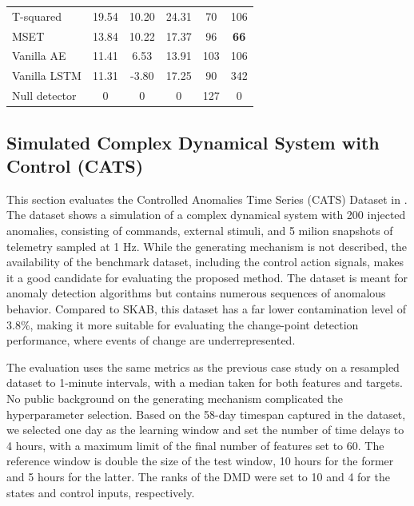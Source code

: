 \begin{table}[H]
\begin{tabular}{l *3{S[table-format=3.2]} *2{S[table-format=3.0]}}
        T-squared                    & 19.54          & 10.20          & 24.31          & 70          & 106         \\
        MSET                         & 13.84          & 10.22          & 17.37          & 96          & \textbf{66} \\
        Vanilla AE                   & 11.41          & 6.53           & 13.91          & 103         & 106         \\
        Vanilla LSTM                 & 11.31          & -3.80          & 17.25          & 90          & 342         \\
        \midrule
        Null detector                & 0              & 0              & 0              & 127         & 0           \\
        \bottomrule
    \end{tabular}
\end{table}


\subsection{Simulated Complex Dynamical System with Control (CATS)}
This section evaluates the Controlled Anomalies Time Series (CATS) Dataset in \citet{Schmidl2022}. The dataset shows a simulation of a complex dynamical system with 200 injected anomalies, consisting of commands, external stimuli, and 5 milion snapshots of telemetry sampled at 1 Hz. While the generating mechanism is not described, the availability of the benchmark dataset, including the control action signals, makes it a good candidate for evaluating the proposed method. The dataset is meant for anomaly detection algorithms but contains numerous sequences of anomalous behavior. Compared to SKAB, this dataset has a far lower contamination level of 3.8\%, making it more suitable for evaluating the change-point detection performance, where events of change are underrepresented.

The evaluation uses the same metrics as the previous case study on a resampled dataset to 1-minute intervals, with a median taken for both features and targets. No public background on the generating mechanism complicated the hyperparameter selection. Based on the 58-day timespan captured in the dataset, we selected one day as the learning window and set the number of time delays to 4 hours, with a maximum limit of the final number of features set to 60. The reference window is double the size of the test window, 10 hours for the former and 5 hours for the latter. The ranks of the DMD were set to 10 and 4 for the states and control inputs, respectively.

